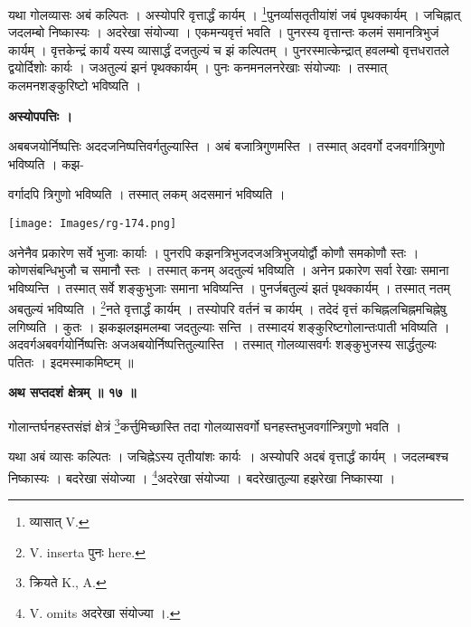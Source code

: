 \documentclass[11pt, openany]{book}
\begin{document}
यथा गोलव्यासः अबं कल्पितः । अस्योपरि वृत्तार्द्धं कार्यम् । \renewcommand{\thefootnote}{१}\footnote{ व्यासात् {\en V.}}पुनर्व्यासतृतीयांशं जबं पृथक्कार्यम् । जचिह्नात् जदलम्बो निष्कास्यः । अदरेखा संयोज्या । एकमन्यवृत्तं भवति । पुनरस्य वृत्तान्तः कलमं समानत्रिभुजं कार्यम् । वृत्तकेन्द्रं कार्यं यस्य व्यासार्द्धं दजतुल्यं
च झं कल्पितम् । पुनरस्मात्केन्द्रात् हवलम्बो वृत्तधरातले द्वयोर्दिशोः कार्यः । जअतुल्यं झनं पृथक्कार्यम् । पुनः कनमनलनरेखाः संयोज्याः । तस्मात् कलमनशङ्कुरिष्टो भविष्यति ।\\
\begin{center}
\textbf{अस्योपपत्तिः ।}
\end{center}
\vspace{3mm}

अबबजयोर्निष्पत्तिः अददजनिष्पत्तिवर्गतुल्यास्ति । अबं बजात्रिगुणमस्ति । तस्मात् अदवर्गो दजवर्गात्रिगुणो भविष्यति । कझ-

\newpage
\noindent वर्गादपि त्रिगुणो भविष्यति । तस्मात् लकम् अदसमानं भविष्यति ।
\begin{center}
\texttt{[image: Images/rg-174.png]}  
\end{center}

अनेनैव प्रकारेण सर्वे भुजाः कार्याः । पुनरपि कझनत्रिभुजदजअत्रिभुजयोर्द्वौ कोणौ समकोणौ स्तः । कोणसंबन्धिभुजौ च समानौ स्तः । तस्मात् कनम् अदतुल्यं भविष्यति । अनेन प्रकारेण सर्वा रेखाः समाना भविष्यन्ति । तस्मात् सर्वे शङ्कुभुजाः समाना भविष्यन्ति । पुनर्जबतुल्यं झतं पृथक्कार्यम् । तस्मात् नतम् अबतुल्यं भविष्यति । \renewcommand{\thefootnote}{१}\footnote{{\en V. inserta} पुनः {\en here.}}नते वृत्तार्द्धं कार्यम् । तस्योपरि वर्तनं च कार्यम् । तदेदं वृत्तं कचिह्नलचिह्नमचिह्नेषु लगिष्यति । कुतः । झकझलझमलम्बा जदतुल्याः सन्ति । तस्मादयं शङ्कुरिष्टगोलान्तःपाती भविष्यति । अदवर्गअबवर्गयोर्निष्पत्तिः अजअबयोर्निष्पत्तितुल्यास्ति~। तस्मात् गोलव्यासवर्गः शङ्कुभुजस्य सार्द्धतुल्यः पतितः । इदमस्माकमिष्टम् ॥\\
\begin{center}
\textbf{\large अथ सप्तदशं क्षेत्रम् ॥ १७ ॥ }
\end{center}
\vspace{5mm}


{\ab गोलान्तर्घनहस्तसंज्ञं क्षेत्रं \renewcommand{\thefootnote}{२}\footnote{क्रियते {\en K., A.} }कर्त्तुमिच्छास्ति तदा गोलव्यासवर्गो घनहस्तभुजवर्गान्त्रिगुणो भवति । }\\
\vspace{5mm}

यथा अबं व्यासः कल्पितः । जचिह्नेऽस्य तृतीयांशः कार्यः~। अस्योपरि अदबं वृत्तार्द्धं कार्यम् । जदलम्बश्च निष्कास्यः । बदरेखा संयोज्या । \renewcommand{\thefootnote}{३}\footnote{ {\en V. omits} अदरेखा संयोज्या ।.}अदरेखा संयोज्या । बदरेखातुल्या हझरेखा निष्कास्या ।
\end{document}
